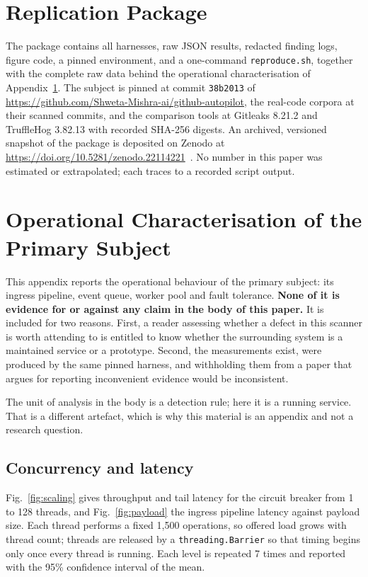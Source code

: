 \documentclass[journal]{IEEEtran}
\begin{document}
\section*{Replication Package}
The package contains all harnesses, raw JSON results, redacted finding logs, figure code, a pinned environment, and a one-command \texttt{reproduce.sh}, together with the complete raw data behind the operational characterisation of Appendix~\ref{app:ops}. The subject is pinned at commit \texttt{38b2013} of \url{https://github.com/Shweta-Mishra-ai/github-autopilot}, the real-code corpora at their scanned commits, and the comparison tools at Gitleaks 8.21.2 and TruffleHog 3.82.13 with recorded SHA-256 digests. An archived, versioned snapshot of the package is deposited on Zenodo at \url{https://doi.org/10.5281/zenodo.22114221}~\cite{mishra2026zenodo}. No number in this paper was estimated or extrapolated; each traces to a recorded script output.

\appendices

\section{Operational Characterisation of the Primary Subject}
\label{app:ops}

This appendix reports the operational behaviour of the primary subject: its ingress pipeline, event queue, worker pool and fault tolerance. \textbf{None of it is evidence for or against any claim in the body of this paper.} It is included for two reasons. First, a reader assessing whether a defect in this scanner is worth attending to is entitled to know whether the surrounding system is a maintained service or a prototype. Second, the measurements exist, were produced by the same pinned harness, and withholding them from a paper that argues for reporting inconvenient evidence would be inconsistent.

The unit of analysis in the body is a detection rule; here it is a running service. That is a different artefact, which is why this material is an appendix and not a research question.

\subsection{Concurrency and latency}

Fig.~\ref{fig:scaling} gives throughput and tail latency for the circuit breaker from 1 to 128 threads, and Fig.~\ref{fig:payload} the ingress pipeline latency against payload size. Each thread performs a fixed 1{,}500 operations, so offered load grows with thread count; threads are released by a \texttt{threading.Barrier} so that timing begins only once every thread is running. Each level is repeated 7 times and reported with the 95\% confidence interval of the mean.
\end{document}
